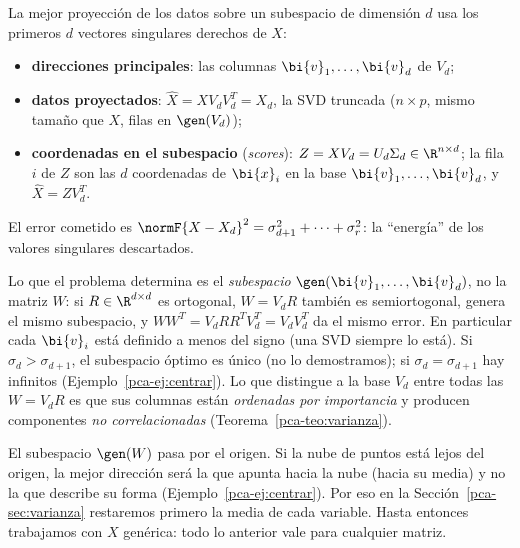 \begin{corollary}\label{pca-cor:practica}
La mejor proyección de los datos sobre un subespacio de dimensión $d$ usa los
primeros $d$ vectores singulares derechos de $X$:
\begin{itemize}[leftmargin=*]
\item \textbf{direcciones principales}: las columnas $\bi{v}_1,\dots,\bi{v}_d$ de $V_d$;
\item \textbf{datos proyectados}: $\widehat X=XV_dV_d^T=X_d$, la SVD
truncada ($n\times p$, mismo tamaño que $X$, filas en $\gen(V_d)$);
\item \textbf{coordenadas en el subespacio} (\emph{scores}):
$Z=XV_d=U_d\Sigma_d\in\R^{n\times d}$; la fila $i$ de $Z$ son las $d$
coordenadas de $\bi{x}_i$ en la base $\bi{v}_1,\dots,\bi{v}_d$, y $\widehat X=ZV_d^T$.
\end{itemize}
El error cometido es $\normF{X-X_d}^2=\sigma_{d+1}^2+\dots+\sigma_r^2$: la
``energía'' de los valores singulares descartados.
\end{corollary}

\begin{remark}\label{pca-rem:unicidad}
Lo que el problema determina es el \emph{subespacio} $\gen(\bi{v}_1,\dots,\bi{v}_d)$,
no la matriz $W$: si $R\in\R^{d\times d}$ es ortogonal, $W=V_dR$ también es
semiortogonal, genera el mismo subespacio, y $WW^T=V_dRR^T V_d^T
=V_dV_d^T$ da el mismo error. En particular cada $\bi{v}_i$ está definido a
menos del signo (una SVD siempre lo está). Si $\sigma_d>\sigma_{d+1}$, el
subespacio óptimo es único (no lo demostramos); si
$\sigma_d=\sigma_{d+1}$ hay infinitos (Ejemplo~\ref{pca-ej:centrar}). Lo que
distingue a la base $V_d$ entre todas las $W=V_dR$ es que sus columnas están
\emph{ordenadas por importancia} y producen componentes \emph{no
correlacionadas} (Teorema~\ref{pca-teo:varianza}).
\end{remark}

\begin{remark}\label{pca-rem:origen}
El subespacio $\gen(W)$ pasa por el origen. Si la nube de puntos está lejos
del origen, la mejor dirección será la que apunta hacia la nube (hacia su
media) y no la que describe su forma (Ejemplo~\ref{pca-ej:centrar}). Por eso
en la Sección~\ref{pca-sec:varianza} restaremos primero la media de cada
variable. Hasta entonces trabajamos con $X$ genérica: todo lo anterior vale
para cualquier matriz.
\end{remark}

